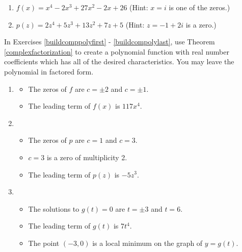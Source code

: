 \begin{enumerate}
\setcounter{enumi}{\value{HW}}

\item $f(x) = x^{4} - 2x^{3} + 27x^{2} - 2x + 26$ (Hint: $x = i$ is one of the zeros.)
\item  $p(z) = 2z^4+5z^3+13z^2+7z+5$ (Hint:  $z = -1+2i$ is a zero.) \label{compfactpolylast}

\setcounter{HW}{\value{enumi}}
\end{enumerate}

In Exercises \ref{buildcomppolyfirst} - \ref{buildcompolylast}, use Theorem \ref{complexfactorization} to create a polynomial function with real number coefficients which has all of the desired characteristics.  You may leave the polynomial in factored form. 

\begin{enumerate}
\setcounter{enumi}{\value{HW}}

\item  \label{buildcomppolyfirst}

\begin{itemize}

\item The zeros of $f$ are $c = \pm 2$ and $c = \pm 1$.
\item The leading term of $f(x)$ is $117x^4$.

\end{itemize}

\item

\begin{itemize}

\item The zeros of $p$ are $c=1$ and $c = 3$.
\item $c=3$ is a zero of multiplicity 2.
\item The leading term of $p(z)$ is $-5z^3$.

\end{itemize}

\item

\begin{itemize}

\item The solutions to $g(t) = 0$ are $t = \pm 3$ and $t=6$.
\item The leading term of $g(t)$ is $7t^4$.
\item The point $(-3,0)$ is a local minimum on the graph of $y=g(t)$.


\end{itemize}
\end{enumerate}
